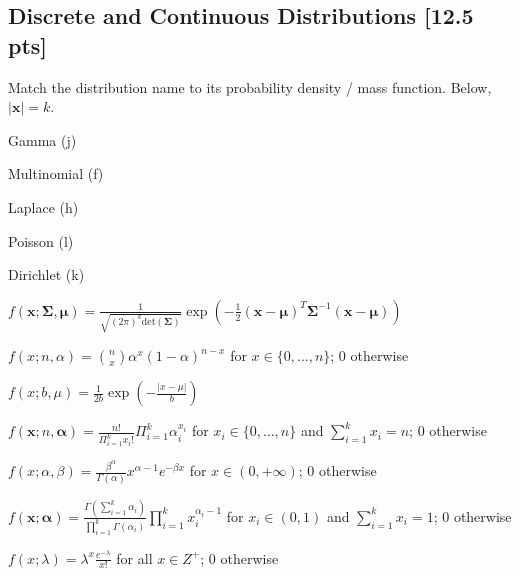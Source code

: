 \documentclass[a4paper]{article}
\theoremstyle{definition}
\newcommand{\vc}[1]{\boldsymbol{#1}}
\newcommand{\xv}{\vc{x}}
\newcommand{\Sigmav}{\vc{\Sigma}}
\newcommand{\alphav}{\vc{\alpha}}
\newcommand{\muv}{\vc{\mu}}
\newenvironment{soln}{
	\leavevmode\color{blue}\ignorespaces
}{}
\begin{document}
	\subsection{Discrete and Continuous Distributions [12.5 pts]}
	Match the distribution name to its probability density / mass
	function. Below, $|\xv| = k$.
	\begin{enumerate}[(a)]
		\begin{minipage}{0.3\linewidth}
			\item Gamma \begin{soln} (j) \end{soln}
			\item Multinomial  \begin{soln} (f) \end{soln}
			\item Laplace \begin{soln} (h) \end{soln}
			\item Poisson \begin{soln} (l) \end{soln}
			\item Dirichlet  \begin{soln} (k) \end{soln}
			
		\end{minipage}
		\begin{minipage}{0.5\linewidth}
			\item $f(\xv; \Sigmav, \muv) = \frac{1}{\sqrt{(2\pi)^k \mathrm{det}(\Sigmav) }} \exp\left( -\frac{1}{2}
			(\xv - \muv)^T \Sigmav^{-1} (\xv - \muv)  \right)$
			\item $f(x; n, \alpha) = \binom{n}{x} \alpha^x (1 - \alpha)^{n-x}$
			for $x \in \{0,\ldots, n\}$; $0$ otherwise
			\item $f(x; b, \mu) = \frac{1}{2b} \exp\left( - \frac{|x - \mu|}{b} \right)$
			\item $f(\xv; n, \alphav) = \frac{n!}{\Pi_{i=1}^k x_i!}
			\Pi_{i=1}^k \alpha_i^{x_i}$ for $x_i \in \{0,\ldots,n\}$ and
			$\sum_{i=1}^k x_i = n$; $0$ otherwise
			\item $f(x; \alpha, \beta) = \frac{\beta^{\alpha}}{\Gamma(\alpha)} x^{\alpha -
				1}e^{-\beta x}$ for $x \in (0,+\infty)$; $0$ otherwise
			\item $f(\xv; \alphav) = \frac{\Gamma(\sum_{i=1}^k
				\alpha_i)}{\prod_{i=1}^k \Gamma(\alpha_i)} \prod_{i=1}^{k}
			x_i^{\alpha_i - 1}$ for $x_i \in (0,1)$ and $\sum_{i=1}^k x_i =
			1$; 0 otherwise
			\item $f(x; \lambda) = \lambda^x \frac{e^{-\lambda}}{x!}$ for all
			$x \in Z^+$; $0$ otherwise
		\end{minipage}
	\end{enumerate}
	
\end{document}
